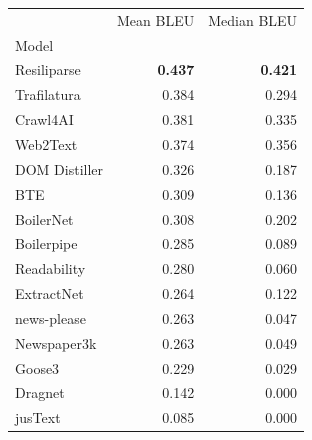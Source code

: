 \begin{tabular}{lrr}
 & Mean BLEU & Median BLEU \\
Model &  &  \\
Resiliparse & \bf 0.437 & \bf 0.421 \\
Trafilatura & 0.384 & 0.294 \\
Crawl4AI & 0.381 & 0.335 \\
Web2Text & 0.374 & 0.356 \\
DOM Distiller & 0.326 & 0.187 \\
BTE & 0.309 & 0.136 \\
BoilerNet & 0.308 & 0.202 \\
Boilerpipe & 0.285 & 0.089 \\
Readability & 0.280 & 0.060 \\
ExtractNet & 0.264 & 0.122 \\
news-please & 0.263 & 0.047 \\
Newspaper3k & 0.263 & 0.049 \\
Goose3 & 0.229 & 0.029 \\
Dragnet & 0.142 & 0.000 \\
jusText & 0.085 & 0.000 \\
\end{tabular}
